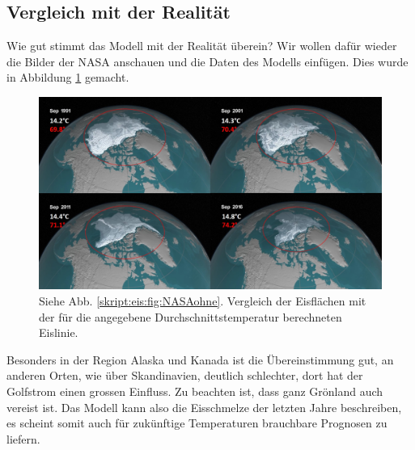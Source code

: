 \begin{refsection}
\subsection{Vergleich mit der Realität}
Wie gut stimmt das Modell mit der Realität überein? Wir wollen dafür wieder die Bilder der NASA anschauen und die Daten des Modells einfügen. Dies wurde in Abbildung \ref{skript:eis:fig:NASA_mit_Breitengraden} gemacht.
\begin{figure}
	\centering
	\includegraphics[width=14cm]{eis/NASA_mit_Breitengraden.jpg}
	\caption{Siehe Abb. \ref{skript:eis:fig:NASAohne}.
	Vergleich der Eisflächen mit der für die angegebene Durchschnittstemperatur berechneten Eislinie.}	\label{skript:eis:fig:NASA_mit_Breitengraden}
\end{figure}
Besonders in der Region Alaska und Kanada ist die Übereinstimmung gut, an anderen Orten, wie über Skandinavien, deutlich schlechter, dort hat der Golfstrom einen grossen Einfluss. Zu beachten ist, dass ganz Grönland auch vereist ist. Das Modell kann also die Eisschmelze der letzten Jahre beschreiben, es scheint somit auch für zukünftige Temperaturen brauchbare Prognosen zu liefern.

\end{refsection}
